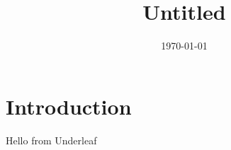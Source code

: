 \documentclass{article}
\title{Untitled}
\author{}
\date{\today}
\begin{document}
\maketitle

\section{Introduction}
Hello from Underleaf 


\end{document}
